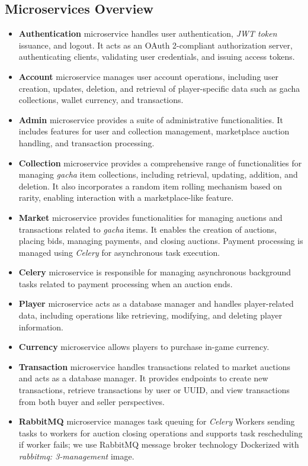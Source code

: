\documentclass{article}
\begin{document}
\subsection{Microservices Overview}
\begin{itemize}
    \item \textbf{Authentication} microservice handles user authentication, \emph{JWT token} issuance, and logout. It acts as an OAuth 2-compliant authorization server, authenticating clients, validating user credentials, and issuing access tokens.
    \item \textbf{Account} microservice manages user account operations, including user creation, updates, deletion, and retrieval of player-specific data such as gacha collections, wallet currency, and transactions.
    \item \textbf{Admin} microservice provides a suite of administrative functionalities. It includes features for user and collection management, marketplace auction handling, and transaction processing.
    \item \textbf{Collection} microservice provides a comprehensive range of functionalities for managing \emph{gacha} item collections, including retrieval, updating, addition, and deletion. It also incorporates a random item rolling mechanism based on rarity, enabling interaction with a marketplace-like feature.
    \item \textbf{Market} microservice provides functionalities for managing auctions and transactions related to \emph{gacha} items. It enables the creation of auctions, placing bids, managing payments, and closing auctions. Payment processing is managed using \emph{Celery} for asynchronous task execution.
    \item \textbf{Celery} microservice is responsible for managing asynchronous background tasks related to payment processing when an auction ends.
    \item \textbf{Player} microservice acts as a database manager and handles player-related data, including operations like retrieving, modifying, and deleting player information.
    \item \textbf{Currency} microservice allows players to purchase in-game currency.
    \item \textbf{Transaction} microservice handles transactions related to market auctions and acts as a database manager. It provides endpoints to create new transactions, retrieve transactions by user or UUID, and view transactions from both buyer and seller perspectives.
    \item \textbf{RabbitMQ} microservice manages task queuing for \emph{Celery} Workers sending tasks to workers for auction closing operations and supports task rescheduling if worker fails; we use RabbitMQ message broker technology Dockerized with \emph{rabbitmq: 3-management} image.
\end{itemize}
\end{document}
